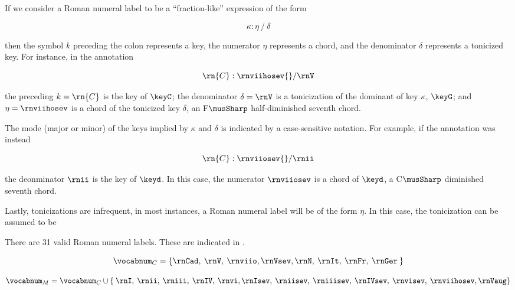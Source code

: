 
If we consider a Roman numeral label to be a
``fraction-like'' expression of the form

\begin{equation}
    \kappa : \eta \: / \: \delta
\end{equation}

then the symbol $k$ preceding the colon represents a key,
the numerator $\eta$ represents a chord, and the denominator
$\delta$ represents a tonicized key. For instance, in the
annotation 

\begin{equation}
    \rn{C}:\rnviihosev{}/\rnV
\end{equation}

the preceding $k=\rn{C}$ is the key of $\keyC$; the
denominator $\delta = \rnV$ is a tonicization of the
dominant of key $\kappa$, $\keyG$; and $\eta=\rnviihosev$ is
a chord of the tonicized key $\delta$, an F$\musSharp$
half-diminished seventh chord.

The mode (major or minor) of the keys implied by $\kappa$
and $\delta$ is indicated by a case-sensitive notation. For
example, if the annotation was instead

\begin{equation}
    \rn{C}:\rnviiosev{}/\rnii
\end{equation}

the deonminator $\rnii$ is the key of $\keyd$. In this case,
the numerator $\rnviiosev$ is a chord of $\keyd$, a
C$\musSharp$ diminished seventh chord.

Lastly, tonicizations are infrequent, in most instances, a
Roman numeral label will be of the form $\eta$. In this
case, the tonicization can be assumed to be 

There are 31 valid Roman numeral labels. These are indicated
in .



\begin{equation}
    \vocabnum_{C} = \{ \rnCad, \: \rnV, \: \rnviio,
    \rnVsev, \rnN, \: \rnIt, \: \rnFr, \: \rnGer \: \}
\end{equation}

\begin{equation}
    \vocabnum_{M} = \vocabnum_{C} \cup \{ \: \rnI, \: \rnii, \: 
    \rniii, \: \rnIV, \: \rnvi, \rnIsev, \: \rniisev, \: 
    \rniiisev, \: \rnIVsev, \: \rnvisev, \: \rnviihosev, \rnVaug \}
\end{equation}

